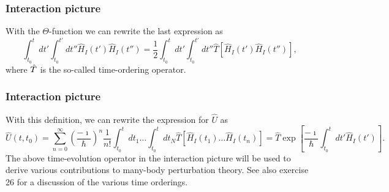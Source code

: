 \frame
{
\frametitle{Interaction picture}
\begin{small}
{\scriptsize
With the $\Theta$-function we can rewrite the last expression as 
\[
\int_{t_0}^t dt'\int_{t_0}^{t'} dt'' \hat{H}_I(t')\hat{H}_I(t'')=
\frac{1}{2}\int_{t_0}^t dt'\int_{t_0}^{t'} dt''\hat{T}\left[\hat{H}_I(t')\hat{H}_I(t'')\right],
\]
where $\Hat{T}$ is the so-called time-ordering operator. 
}
\end{small}
}
\frame
{
\frametitle{Interaction picture}
\begin{small}
{\scriptsize
With this definition, we can rewrite the expression for $\hat{U}$ as 
\[
\hat{U}(t,t_0)=\sum_{n=0}^{\infty}\left(\frac{-\imath}{\hbar}\right)^n\frac{1}{n!}
\int_{t_0}^t dt_1\dots \int_{t_0}^t dt_N \hat{T}\left[\hat{H}_I(t_1)\dots\hat{H}_I(t_n)\right]=\hat{T}\exp{\left[\frac{-\imath}{\hbar}
\int_{t_0}^t dt' \hat{H}_I(t')\right]}.
\]
The above time-evolution operator in the interaction picture will be used
to derive various contributions to many-body perturbation theory. See also exercise 26 for a discussion of the various time orderings.
}
\end{small}
}

